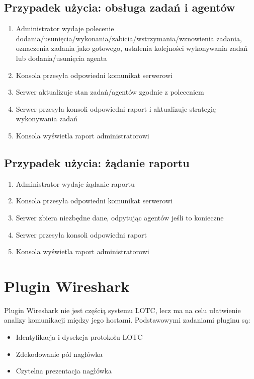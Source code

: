 \documentclass[10pt,a4paper]{article}
\begin{document}
        \subsection{Przypadek użycia: obsługa zadań i agentów}
            \begin{enumerate}
	            \item Administrator wydaje polecenie dodania/usunięcia/wykonania/zabicia/wstrzymania/wznowienia zadania, oznaczenia zadania jako gotowego, ustalenia kolejności wykonywania zadań lub dodania/usunięcia agenta
	            \item Konsola przesyła odpowiedni komunikat serwerowi
	            \item Serwer aktualizuje stan zadań/agentów zgodnie z poleceniem
	            \item Serwer przesyła konsoli odpowiedni raport i aktualizuje strategię wykonywania zadań
	            \item Konsola wyświetla raport administratorowi
            \end{enumerate}
        
        \subsection{Przypadek użycia: żądanie raportu}
            \begin{enumerate}
	            \item Administrator wydaje żądanie raportu
	            \item Konsola przesyła odpowiedni komunikat serwerowi
	            \item Serwer zbiera niezbędne dane, odpytując agentów jeśli to konieczne
	            \item Serwer przesyła konsoli odpowiedni raport
	            \item Konsola wyświetla raport administratorowi
            \end{enumerate}
    
    \section{Plugin Wireshark}
    
        Plugin Wireshark nie jest częścią systemu LOTC, lecz ma na celu ułatwienie analizy komunikacji między jego hostami. Podstawowymi zadaniami pluginu są:
        
        \begin{itemize}   
			\item Identyfikacja i dysekcja protokołu LOTC
			\item Zdekodowanie pól nagłówka
		    \item Czytelna prezentacja nagłówka
	    \end{itemize}
	    
\end{document}
